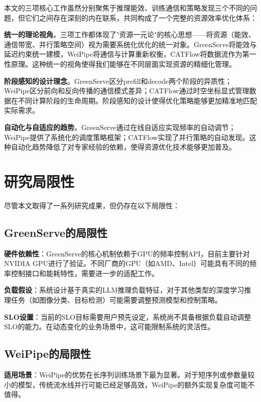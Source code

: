 本文的三项核心工作虽然分别聚焦于推理能效、训练通信和策略发现三个不同的问题，但它们之间存在深刻的内在联系，共同构成了一个完整的资源效率优化体系：

\textbf{统一的理论视角}。三项工作都体现了"资源一元论"的核心思想——将资源（能效、通信带宽、并行策略空间）视为需要系统化优化的统一对象。GreenServe将能效与延迟约束统一建模，WeiPipe将通信与计算重新权衡，CATFlow将数据流作为第一性原理。这种统一的视角使得我们能够在不同层面实现资源的精细化管理。

\textbf{阶段感知的设计理念}。GreenServe区分prefill和decode两个阶段的异质性；WeiPipe区分前向和反向传播的通信模式差异；CATFlow通过时空坐标显式管理数据在不同计算阶段的生命周期。阶段感知的设计使得优化策略能够更加精准地匹配实际需求。

\textbf{自动化与自适应的趋势}。GreenServe通过在线自适应实现频率的自动调节；WeiPipe提供了系统化的调度策略框架；CATFlow实现了并行策略的自动发现。这种自动化趋势降低了对专家经验的依赖，使得资源优化技术能够更加普及。

\section{研究局限性}

尽管本文取得了一系列研究成果，但仍存在以下局限性：

\subsection{GreenServe的局限性}

\textbf{硬件依赖性}：GreenServe的核心机制依赖于GPU的频率控制API，目前主要针对NVIDIA GPU进行了验证。不同厂商的GPU（如AMD、Intel）可能具有不同的频率控制接口和能耗特性，需要进一步的适配工作。

\textbf{负载假设}：系统设计基于真实的LLM推理负载特征，对于其他类型的深度学习推理任务（如图像分类、目标检测）可能需要调整预测模型和控制策略。

\textbf{SLO设置}：当前的SLO目标需要用户预先设定，系统尚不具备根据负载自动调整SLO的能力。在动态变化的业务场景中，这可能限制系统的灵活性。

\subsection{WeiPipe的局限性}

\textbf{适用场景}：WeiPipe的优势在长序列训练场景下最为显著。对于短序列或参数量较小的模型，传统流水线并行可能已经足够高效，WeiPipe的额外实现复杂度可能不值得。

